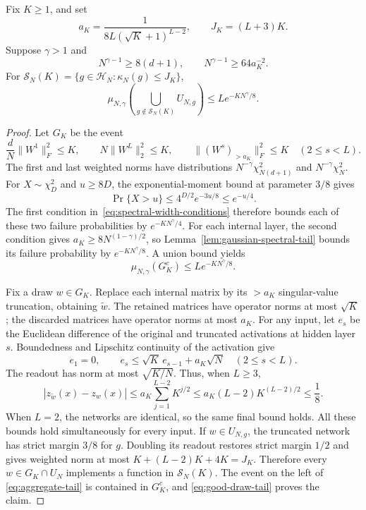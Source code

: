 \begin{lemma}
\label{lem:aggregate-structural-tail}
Fix $K\geq1$, and set
\[
 a_K=\frac{1}{8L(\sqrt K+1)^{L-2}},\qquad
 J_K=(L+3)K.
\]
Suppose $\gamma>1$ and
\begin{equation}\label{eq:spectral-width-conditions}
 N^{\gamma-1}\geq8(d+1),\qquad
 N^{\gamma-1}\geq64a_K^{-2}.
\end{equation}
For
$\mathcal S_N(K)=\{g\in\mathcal H_N:\kappa_N(g)\leq J_K\}$,
\begin{equation}\label{eq:aggregate-tail}
 \mu_{N,\gamma}\left(\bigcup_{g\notin\mathcal S_N(K)}U_{N,g}\right)
 \leq L e^{-KN^\gamma/8}.
\end{equation}
\end{lemma}
\begin{proof}
Let $G_K$ be the event
\[
 \frac dN\|W^1\|_F^2\leq K,\qquad
 N\|W^L\|_2^2\leq K,\qquad
 \|(W^s)_{>a_K}\|_F^2\leq K\quad(2\leq s<L).
\]
The first and last weighted norms have distributions
$N^{-\gamma}\chi^2_{N(d+1)}$ and $N^{-\gamma}\chi^2_N$.
For $X\sim\chi_D^2$ and $u\geq8D$, the exponential-moment bound at
parameter $3/8$ gives
\[
 \Pr\{X>u\}\leq 4^{D/2}e^{-3u/8}\leq e^{-u/4}.
\]
The first condition in~\eqref{eq:spectral-width-conditions} therefore bounds
each of these two failure probabilities by $e^{-KN^\gamma/4}$.
For each internal layer, the second condition gives
$a_K\geq8N^{(1-\gamma)/2}$, so Lemma~\ref{lem:gaussian-spectral-tail}
bounds its failure probability by $e^{-KN^\gamma/8}$.
A union bound yields
\begin{equation}\label{eq:good-draw-tail}
 \mu_{N,\gamma}(G_K^c)\leq L e^{-KN^\gamma/8}.
\end{equation}

Fix a draw $w\in G_K$. Replace each internal matrix by its
$>a_K$ singular-value truncation, obtaining $\widetilde w$.
The retained matrices have operator norms at most $\sqrt K$; the discarded
matrices have operator norms at most $a_K$.
For any input, let $e_s$ be the Euclidean difference of the original and
truncated activations at hidden layer $s$. Boundedness and Lipschitz
continuity of the activation give
\[
 e_1=0,\qquad e_s\leq\sqrt K\,e_{s-1}+a_K\sqrt N
 \quad(2\leq s<L).
\]
The readout has norm at most $\sqrt{K/N}$. Thus, when $L\geq3$,
\[
 |z_{\widetilde w}(x)-z_w(x)|
 \leq a_K\sum_{j=1}^{L-2}K^{j/2}
 \leq a_K(L-2)K^{(L-2)/2}\leq\frac18.
\]
When $L=2$, the networks are identical, so the same final bound holds.
All these bounds hold simultaneously for every input.
If $w\in U_{N,g}$, the truncated network has strict margin $3/8$ for $g$.
Doubling its readout restores strict margin $1/2$ and gives weighted norm
at most $K+(L-2)K+4K=J_K$. Therefore every $w\in G_K\cap U_N$ implements
a function in $\mathcal S_N(K)$. The event on the left of
\eqref{eq:aggregate-tail} is contained in $G_K^c$, and
\eqref{eq:good-draw-tail} proves the claim.
\end{proof}

